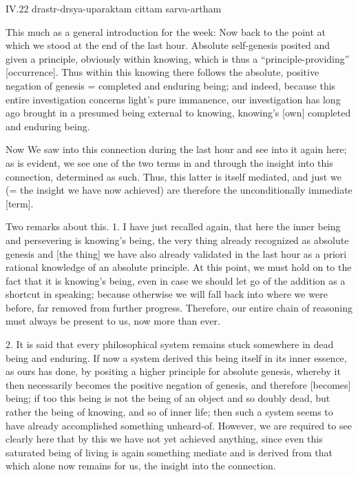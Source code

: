 IV.22
drastr-drsya-uparaktam cittam sarva-artham

This much as a general introduction for the week:
Now back to the point at which we stood at the end of the last hour.
Absolute self-genesis posited and given a principle,
obviously within knowing,
which is thus a “principle-providing” [occurrence].
Thus within this knowing there follows
the absolute, positive negation of genesis =
completed and enduring being;
and indeed, because this entire investigation
concerns light's pure immanence,
our investigation has long ago brought in
a presumed being external to knowing,
knowing's [own] completed and enduring being.

Now We saw into this connection during the last hour
and see into it again here;
as is evident, we see one of the two terms
in and through the insight into this connection,
determined as such.
Thus, this latter is itself mediated,
and just we (= the insight we have now achieved) are
therefore the unconditionally immediate [term].

Two remarks about this.
1. I have just recalled again,
that here the inner being and persevering is knowing's being,
the very thing already recognized as absolute genesis
and [the thing] we have also already validated in the last hour
as a priori rational knowledge of an absolute principle.
At this point, we must hold on to
the fact that it is knowing's being,
even in case we should let go of
the addition as a shortcut in speaking;
because otherwise we will fall back into
where we were before, far removed from further progress.
Therefore, our entire chain of reasoning
must always be present to us, now more than ever.

2. It is said that every philosophical system
remains stuck somewhere in dead being and enduring.
If now a system derived this being itself in its inner essence,
as ours has done, by positing a higher principle for absolute genesis,
whereby it then necessarily becomes the positive negation of genesis,
and therefore [becomes] being;
if too this being is not the being of an object and so doubly dead,
but rather the being of knowing, and so of inner life;
then such a system seems to have already
accomplished something unheard-of.
However, we are required to see clearly here that
by this we have not yet achieved anything,
since even this saturated being of living is
again something mediate and is derived from that
which alone now remains for us,
the insight into the connection.

